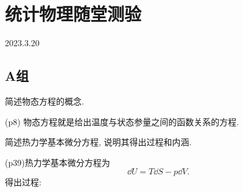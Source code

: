 \section{统计物理随堂测验}
2023.3.20
\subsection{A组}
\begin{questions}
  \question 简述物态方程的概念.
  \begin{solution}
    (p8) 物态方程就是给出温度与状态参量之间的函数关系的方程.
  \end{solution}
  \question 简述热力学基本微分方程, 说明其得出过程和内涵.
  \begin{solution}
    (p39)热力学基本微分方程为
    \begin{equation}
      \dd U = T\dd S - p\dd V.
    \end{equation}
    得出过程:


\end{solution}
\end{questions}
